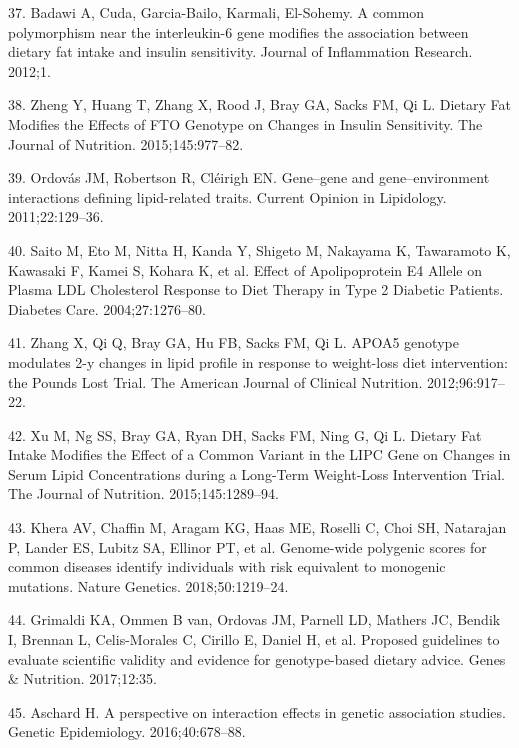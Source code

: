 \documentclass[]{article}
\begin{document}
\leavevmode\hypertarget{ref-Cuda2012}{}%
37. Badawi A, Cuda, Garcia-Bailo, Karmali, El-Sohemy. A common
polymorphism near the interleukin-6 gene modifies the association
between dietary fat intake and insulin sensitivity. Journal of
Inflammation Research. 2012;1.

\leavevmode\hypertarget{ref-Zheng2015}{}%
38. Zheng Y, Huang T, Zhang X, Rood J, Bray GA, Sacks FM, Qi L. Dietary
Fat Modifies the Effects of FTO Genotype on Changes in Insulin
Sensitivity. The Journal of Nutrition. 2015;145:977--82.

\leavevmode\hypertarget{ref-Ordovas2011}{}%
39. Ordovás JM, Robertson R, Cléirigh EN. Gene--gene and
gene--environment interactions defining lipid-related traits. Current
Opinion in Lipidology. 2011;22:129--36.

\leavevmode\hypertarget{ref-Saito2004}{}%
40. Saito M, Eto M, Nitta H, Kanda Y, Shigeto M, Nakayama K, Tawaramoto
K, Kawasaki F, Kamei S, Kohara K, et al. Effect of Apolipoprotein E4
Allele on Plasma LDL Cholesterol Response to Diet Therapy in Type 2
Diabetic Patients. Diabetes Care. 2004;27:1276--80.

\leavevmode\hypertarget{ref-Zhang2012}{}%
41. Zhang X, Qi Q, Bray GA, Hu FB, Sacks FM, Qi L. APOA5 genotype
modulates 2-y changes in lipid profile in response to weight-loss diet
intervention: the Pounds Lost Trial. The American Journal of Clinical
Nutrition. 2012;96:917--22.

\leavevmode\hypertarget{ref-Xu2015}{}%
42. Xu M, Ng SS, Bray GA, Ryan DH, Sacks FM, Ning G, Qi L. Dietary Fat
Intake Modifies the Effect of a Common Variant in the LIPC Gene on
Changes in Serum Lipid Concentrations during a Long-Term Weight-Loss
Intervention Trial. The Journal of Nutrition. 2015;145:1289--94.

\leavevmode\hypertarget{ref-Khera2018}{}%
43. Khera AV, Chaffin M, Aragam KG, Haas ME, Roselli C, Choi SH,
Natarajan P, Lander ES, Lubitz SA, Ellinor PT, et al. Genome-wide
polygenic scores for common diseases identify individuals with risk
equivalent to monogenic mutations. Nature Genetics. 2018;50:1219--24.

\leavevmode\hypertarget{ref-Grimaldi2017}{}%
44. Grimaldi KA, Ommen B van, Ordovas JM, Parnell LD, Mathers JC, Bendik
I, Brennan L, Celis-Morales C, Cirillo E, Daniel H, et al. Proposed
guidelines to evaluate scientific validity and evidence for
genotype-based dietary advice. Genes \& Nutrition. 2017;12:35.

\leavevmode\hypertarget{ref-Aschard2016}{}%
45. Aschard H. A perspective on interaction effects in genetic
association studies. Genetic Epidemiology. 2016;40:678--88.
\end{document}
